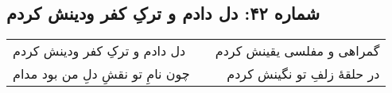 \begin{center}
\section*{شماره ۴۲: دل دادم و ترکِ کفر ودینش کردم}
\label{sec:042}
\begin{longtable}{l p{0.5cm} r}
دل دادم و ترکِ کفر ودینش کردم
&&
گمراهی و مفلسی یقینش کردم
\\
چون نامِ تو نقشِ دلِ من بود مدام
&&
در حلقهٔ زلفِ تو نگینش کردم
\\
\end{longtable}
\end{center}
